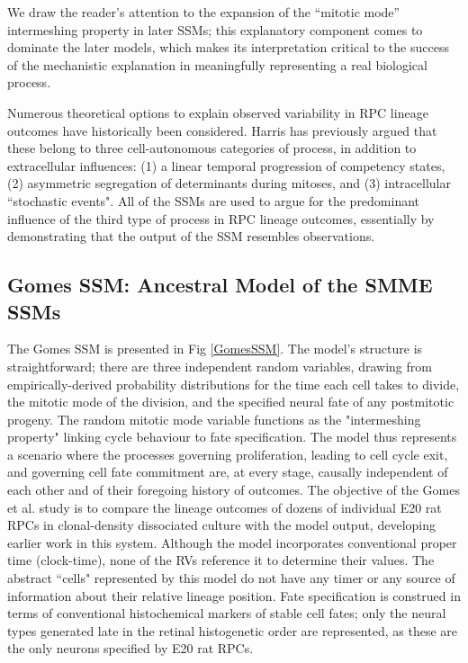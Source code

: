 We draw the reader's attention to the expansion of the ``mitotic mode'' intermeshing property in later SSMs; this explanatory component comes to dominate the later models, which makes its interpretation critical to the success of the mechanistic explanation in meaningfully representing a real biological process. 

Numerous theoretical options to explain observed variability in RPC lineage outcomes have historically been considered. Harris has previously argued that these belong to three cell-autonomous categories of process, in addition to extracellular influences: (1) a linear temporal progression of competency states, (2) asymmetric segregation of determinants during mitoses, and (3) intracellular ``stochastic events"\cite{Holt1988,Agathocleous2009}. All of the SSMs are used to argue for the predominant influence of the third type of process in RPC lineage outcomes, essentially by demonstrating that the output of the SSM resembles observations.
 
 \subsection{Gomes SSM: Ancestral Model of the SMME SSMs}
 
The Gomes SSM is presented in Fig \ref{GomesSSM}. The model's structure is straightforward; there are three independent random variables, drawing from empirically-derived probability distributions for the time each cell takes to divide, the mitotic mode of the division, and the specified neural fate of any postmitotic progeny. The random mitotic mode variable functions as the "intermeshing property" linking cycle behaviour to fate specification. The model thus represents a scenario where the processes governing proliferation, leading to cell cycle exit, and governing cell fate commitment are, at every stage, causally independent of each other and of their foregoing history of outcomes. The objective of the Gomes et al. study is to compare the lineage outcomes of dozens of individual E20 rat RPCs in clonal-density dissociated culture with the model output, developing earlier work in this system\cite{Cayouette2003}. Although the model incorporates conventional proper time (clock-time), none of the RVs reference it to determine their values. The abstract ``cells" represented by this model do not have any timer or any source of information about their relative lineage position.  Fate specification is construed in terms of conventional histochemical markers of stable cell fates; only the neural types generated late in the retinal histogenetic order are represented, as these are the only neurons specified by E20 rat RPCs.
 
